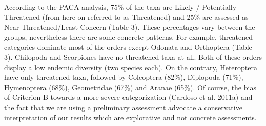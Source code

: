 According to the PACA analysis, 75\% of the taxa are Likely / Potentially
Threatened (from here on referred to as Threatened) and 25\% are assessed as
Near Threatened/Least Concern (Table 3). These percentages vary between the groups,
nevertheless there are some concrete patterns. For example, threatened
categories dominate most of the orders except Odonata and Orthoptera (Table 3).
Chilopoda and Scorpiones have no threatened taxa at all. Both of these orders
display a low endemic diversity (two species each). On the contrary,
Heteroptera have only threatened taxa, followed by Coleoptera (82\%),
Diplopoda (71\%), Hymenoptera (68\%), Geometridae (67\%) and Aranae (65\%).
Of course, the bias of Criterion B towards a more severe categorization
(Cardoso et al. 2011a) and the fact that we are using a preliminary assessment
advocate a conservative interpretation of our results which are explorative and not concrete assessments.


